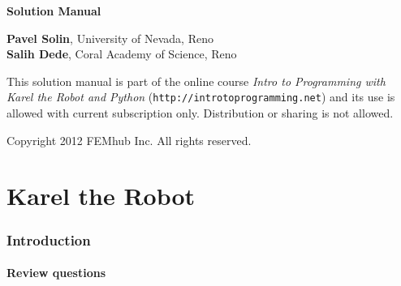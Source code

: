 \documentclass[article,A4,12pt]{llncs}
\begin{document}
\begin{center}
\vspace{2.8cm}
{\huge \bf Solution Manual}
\end{center}
\vbox{}
\begin{center}
\vfill
{\large
{\bf Pavel Solin}, University of Nevada, Reno\\
{\bf Salih Dede}, Coral Academy of Science, Reno
}
\end{center}
\newpage
\vbox{}
\vfill
\begin{center}
{\large
This solution manual is part of the online course 
{\em Intro to Programming with Karel the Robot and Python} 
({\tt http://introtoprogramming.net}) and its use is allowed 
with current subscription only. Distribution or sharing is not allowed. \\
}
\vfill

Copyright 2012 FEMhub Inc. All rights reserved.
\end{center}




\section*{}
\small

\normalsize

\newpage
\setcounter{tocdepth}{2}
\tableofcontents

\newpage

\pagestyle{plain}
\setcounter{page}{1}


\part{Karel the Robot}

\section{Introduction}

\subsection{Review questions}
\end{document}
